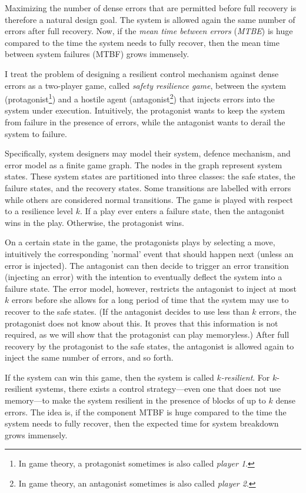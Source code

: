 Maximizing the number of dense errors that are permitted before full recovery is therefore a natural design goal.  
The system is allowed again the same number of errors after full recovery.
Now, if the {\em mean time between errors} ({\em MTBE}) is huge compared to the time the system needs to fully recover, then the mean time between system failures (MTBF) grows immensely. 

I treat the problem of designing a resilient control mechanism against dense errors as a two-player game, called {\em safety resilience game}, between the system (protagonist\footnote{In game theory, a protagonist sometimes is also called {\em player 1}.}) and a hostile agent (antagonist\footnote{In game theory, an antagonist sometimes is also called {\em player 2}.}) that injects errors into the system under execution.
Intuitively, the protagonist wants to keep the system from failure in the presence of errors, while the antagonist wants to derail the system to failure.

Specifically, system designers may model their system, defence mechanism, and error model as a finite game graph.
The nodes in the graph represent system states.
These system states are partitioned into three classes: the safe states, the failure states, and the recovery states. 
Some transitions are labelled with errors while others are considered normal transitions.
The game is played with respect to a resilience level $k$.
If a play ever enters a failure state, then the antagonist wins in the play.  
Otherwise, the protagonist wins.

On a certain state in the game, the protagonists plays by selecting a move, intuitively the corresponding 'normal' event that should happen next (unless an error is injected).
The antagonist can then decide to trigger an error transition (injecting an error) with the intention to eventually deflect the system into a failure state.
The error model, however, restricts the antagonist to inject at most $k$ errors before she allows for a long period of time that the system may use to recover to the safe states.
(If the antagonist decides to use less than $k$ errors, the protagonist does not know about this. It proves that this information is not required, as we will show that the protagonist can play memoryless.)
After full recovery by the protagonist to the safe states, the antagonist is allowed again to inject the same number of errors, and so forth.
  
If the system can win this game, then the system is called {\em $k$-resilient}.
For $k$-resilient systems, there exists a control strategy---even one that does not use memory---to make the system resilient in the presence of blocks of up to $k$ dense errors. 
The idea is, if the component MTBF is huge compared to the time the system needs to fully recover, then the expected time for system breakdown grows immensely.  

